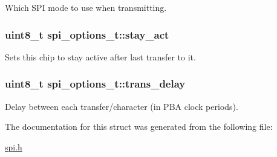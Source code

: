 \-Which \-S\-P\-I mode to use when transmitting. 

\hypertarget{structspi__options__t_a9bbd0582cc9fb1f01aaba5761f139119}{
\subsubsection[{stay\-\_\-act}]{\setlength{\rightskip}{0pt plus 5cm}uint8\-\_\-t {\bf spi\-\_\-options\-\_\-t\-::stay\-\_\-act}}}
\label{structspi__options__t_a9bbd0582cc9fb1f01aaba5761f139119}


\-Sets this chip to stay active after last transfer to it. 

\hypertarget{structspi__options__t_aedb727a3304efbedc75f61c3312c6dae}{
\subsubsection[{trans\-\_\-delay}]{\setlength{\rightskip}{0pt plus 5cm}uint8\-\_\-t {\bf spi\-\_\-options\-\_\-t\-::trans\-\_\-delay}}}
\label{structspi__options__t_aedb727a3304efbedc75f61c3312c6dae}


\-Delay between each transfer/character (in \-P\-B\-A clock periods). 



\-The documentation for this struct was generated from the following file\-:\begin{DoxyCompactItemize}
\item 
\hyperlink{spi_8h}{spi.\-h}\end{DoxyCompactItemize}
